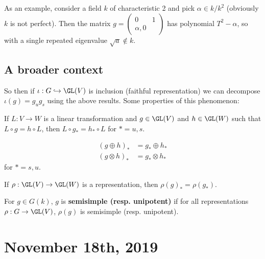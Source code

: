 \documentclass[12pt]{article}
\begin{document}
As an example, consider a field $k$ of characteristic 2 and pick $\alpha\in k/k^2$ (obviously $k$ is not perfect). Then the matrix $g=(\begin{smallmatrix}
	0& 1\\\alpha,0
\end{smallmatrix})$ has polynomial $T^2-\alpha$, so with a single repeated eigenvalue $\sqrt a\notin k$.

\subsection{A broader context}
So then if $\iota:G\hookrightarrow\GL(V)$ is inclusion (faithful representation) we can decompose $\iota(g)=g_ug_s$ using the above results. Some properties of this phenomenon:
\begin{prop}
	If $L:V\to W$ is a linear transformation and $g\in\GL(V)$ and $h\in\GL(W)$ such that $L\circ g=h\circ L$,
	then $L\circ g_\ast=h_\ast\circ L$ for $\ast=u,s$.
\end{prop}
\begin{prop}
	\begin{align*}
		(g\oplus h)_\ast&=g_\ast\oplus h_\ast\\
		(g\otimes h)_\ast&=g_\ast\otimes h_\ast
	\end{align*}
	for $\ast=s,u$.
\end{prop}
\begin{prop}
	If $\rho:\GL(V)\to \GL(W)$ is a representation, then $\rho(g)_\ast=\rho(g_\ast)$.
\end{prop}

\begin{defn}
	For $g\in G(k)$, $g$ is \textbf{semisimple (resp. unipotent)} if for all representations $\rho:G\to \GL(V)$,
	$\rho(g)$ is semisimple (resp. unipotent).
\end{defn}

\section{November 18th, 2019}
\end{document}
